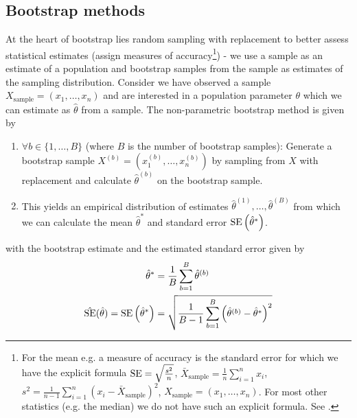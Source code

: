\subsection{Bootstrap methods}

At the heart of bootstrap lies random sampling with replacement to better assess statistical
estimates (assign measures of accuracy\footnote{For the mean e.g. a measure of accuracy is the standard error for which we have the explicit formula $\operatorname{SE} = \sqrt{\frac{s^2}{n}}$, $\bar{X}_{\text{sample}} = \frac{1}{n} \sum_{i=1}^{n} x_i$, $s^2 = \frac{1}{n-1} \sum_{i=1}^{n} (x_i - \bar{X}_{\text{sample}})^2$, $X_{\text{sample}} = (x_1,\dots,x_n)$. For most other statistics (e.g. the median) we do not have such an explicit formula. See \cite[chapter 1]{Efron1994}.}) - we use a sample as an estimate of a population and bootstrap samples from the sample
as estimates of the sampling distribution. Consider we have observed a sample $X_{\text{sample}} = (x_1,\dots,x_n)$ and are interested in a population parameter
$\theta$ which we can estimate as $\hat{\theta}$ from a sample. The non-parametric bootstrap method is given by
\begin{enumerate}
    \item $\forall b \in \{1, \dots, B\}$ (where $B$ is the number of bootstrap samples): Generate a bootstrap sample $X^{(b)} = (x_1^{(b)},\dots,x_n^{(b)})$ by sampling from $X$ with replacement and calculate $\hat{\theta}^{(b)}$ on the bootstrap sample.
    \item This yields an empirical distribution of estimates $\hat{\theta}^{(1)},\dots,\hat{\theta}^{(B)}$ from which we can calculate the mean $\hat{\theta}^{*}$ and standard error $\operatorname{SE}\left(\hat{\theta}^*\right)$.
\end{enumerate}
with the bootstrap estimate and the estimated standard error given by
\begin{equation}
    \begin{aligned}
        \hat{\theta}^{*} &= \frac{1}{B} \sum_{b=1}^{B} \hat{\theta}^{(b)} \\
        \hat{\operatorname{SE}}(\hat{\theta}) = \operatorname{SE}\left(\hat{\theta}^*\right) &= \sqrt{\frac{1}{B-1} \sum_{b=1}^{B} \left( \hat{\theta}^{(b)} - \hat{\theta}^{*} \right)^2}
    \end{aligned}
\end{equation}

